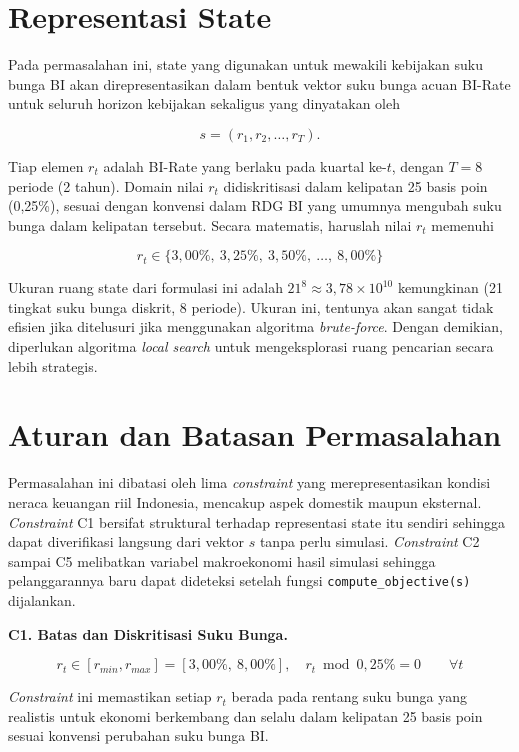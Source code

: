 \section{Representasi State}

Pada permasalahan ini, state yang digunakan untuk mewakili kebijakan suku bunga BI akan direpresentasikan dalam bentuk vektor suku bunga acuan BI-Rate untuk seluruh horizon kebijakan sekaligus yang dinyatakan oleh

\[
    s = (r_1, r_2, \dots, r_T).
\]

Tiap elemen $r_t$ adalah BI-Rate yang berlaku pada kuartal ke-$t$, dengan $T = 8$ periode (2 tahun). Domain nilai $r_t$ didiskritisasi dalam kelipatan 25 basis poin (0,25\%), sesuai dengan konvensi dalam RDG BI yang umumnya mengubah suku bunga dalam kelipatan tersebut. Secara matematis, haruslah nilai $r_t$ memenuhi

\[
    r_t \in \{3{,}00\%,\ 3{,}25\%,\ 3{,}50\%,\ \dots,\ 8{,}00\%\}
\]

Ukuran ruang state dari formulasi ini adalah $21^{8} \approx 3,78 \times 10^{10}$ kemungkinan (21 tingkat suku bunga diskrit, 8 periode). Ukuran ini, tentunya akan sangat tidak efisien jika ditelusuri jika menggunakan algoritma \textit{brute-force}. Dengan demikian, diperlukan algoritma \textit{local search} untuk mengeksplorasi ruang pencarian secara lebih strategis.

\section{Aturan dan Batasan Permasalahan}

Permasalahan ini dibatasi oleh lima \textit{constraint} yang merepresentasikan kondisi neraca keuangan riil Indonesia, mencakup aspek domestik maupun eksternal. \textit{Constraint} C1 bersifat struktural terhadap representasi state itu sendiri sehingga dapat diverifikasi langsung dari vektor $s$ tanpa perlu simulasi. \textit{Constraint} C2 sampai C5 melibatkan variabel makroekonomi hasil simulasi sehingga pelanggarannya baru dapat dideteksi setelah fungsi \texttt{compute\_objective(s)} dijalankan.

\textbf{C1. Batas dan Diskritisasi Suku Bunga.}

\[
    r_t \in [r_{min}, r_{max}] = [3{,}00\%,\ 8{,}00\%], \quad r_t \bmod 0{,}25\% = 0 \qquad \forall t
\]

\textit{Constraint} ini memastikan setiap $r_t$ berada pada rentang suku bunga yang realistis untuk ekonomi berkembang dan selalu dalam kelipatan 25 basis poin sesuai konvensi perubahan suku bunga BI.

